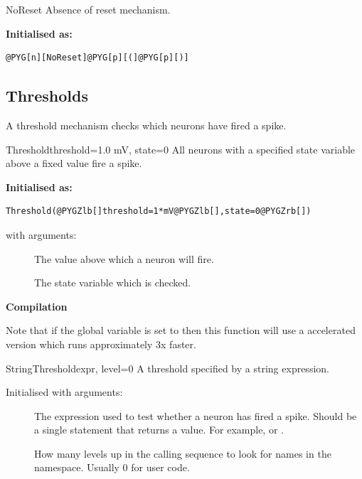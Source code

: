 \documentclass[letterpaper,10pt,english]{manual}
\begin{document}
\hypertarget{brian.NoReset}{}\begin{classdesc}{NoReset}{}
Absence of reset mechanism.

\textbf{Initialised as:}

\begin{Verbatim}[commandchars=@\[\]]
@PYG[n][NoReset]@PYG[p][(]@PYG[p][)]
\end{Verbatim}
\end{classdesc}

\subsection{Thresholds}

A threshold mechanism checks which neurons have fired a
spike.

\hypertarget{brian.Threshold}{}\begin{classdesc}{Threshold}{threshold=1.0 mV, state=0}
All neurons with a specified state variable above a fixed value fire a spike.

\textbf{Initialised as:}

\begin{Verbatim}[commandchars=@\[\]]
Threshold(@PYGZlb[]threshold=1*mV@PYGZlb[],state=0@PYGZrb[])
\end{Verbatim}

with arguments:
\begin{description}
\item[] \leavevmode
The value above which a neuron will fire.

\item[] \leavevmode
The state variable which is checked.

\end{description}

\textbf{Compilation}

Note that if the global variable  is set to 
then this function will use a  accelerated version which
runs approximately 3x faster.
\end{classdesc}

\hypertarget{brian.StringThreshold}{}\begin{classdesc}{StringThreshold}{expr, level=0}
A threshold specified by a string expression.

Initialised with arguments:
\begin{description}
\item[] \leavevmode
The expression used to test whether a neuron has fired a spike.
Should be a single statement that returns a value. For example,
 or .

\item[] \leavevmode
How many levels up in the calling sequence to look for
names in the namespace. Usually 0 for user code.

\end{description}
\end{classdesc}
\end{document}
